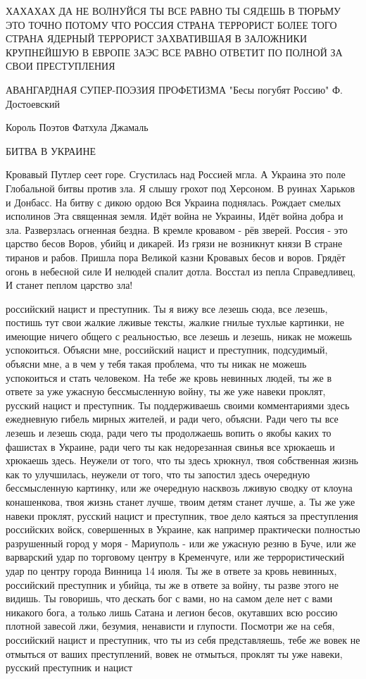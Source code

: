 ХАХАХАХ ДА НЕ ВОЛНУЙСЯ ТЫ ВСЕ РАВНО ТЫ СЯДЕШЬ В ТЮРЬМУ ЭТО ТОЧНО ПОТОМУ ЧТО
РОССИЯ СТРАНА ТЕРРОРИСТ БОЛЕЕ ТОГО СТРАНА ЯДЕРНЫЙ ТЕРРОРИСТ ЗАХВАТИВШАЯ В
ЗАЛОЖНИКИ КРУПНЕЙШУЮ В ЕВРОПЕ ЗАЭС ВСЕ РАВНО ОТВЕТИТ ПО ПОЛНОЙ ЗА СВОИ
ПРЕСТУПЛЕНИЯ

АВАНГАРДНАЯ СУПЕР-ПОЭЗИЯ ПРОФЕТИЗМА 
"Бесы погубят Россию" 
Ф. Достоевский

Король Поэтов Фатхула Джамаль

БИТВА В УКРАИНЕ 

Кровавый Путлер сеет горе. 
Сгустилась над Россией мгла.
А Украина это поле
Глобальной битвы против зла. 
Я слышу грохот под Херсоном.
В руинах Харьков и Донбасс.
На битву с дикою ордою
Вся Украина поднялась. 
Рождает смелых исполинов 
Эта священная земля.
Идёт война не Украины, 
Идёт война добра и зла.
Разверзлась огненная бездна. 
В кремле кровавом - рёв зверей.
Россия - это царство бесов 
Воров, убийц и дикарей. 
Из грязи не возникнут князи 
В стране тиранов и рабов. 
Пришла пора Великой казни 
Кровавых бесов и воров.
Грядёт огонь в небесной силе
И нелюдей спалит дотла.
Восстал из пепла Справедливец, 
И станет пеплом царство зла! 


российский нацист и преступник. Ты я вижу все лезешь сюда, все лезешь, постишь
тут свои жалкие лживые тексты, жалкие гнилые тухлые картинки, не имеющие ничего
общего с реальностью, все лезешь и лезешь, никак не можешь успокоиться. Объясни
мне, российский нацист и преступник, подсудимый, объясни мне, а в чем у тебя
такая проблема, что ты никак не можешь успокоиться и стать человеком. На тебе
же кровь невинных людей, ты же в ответе за уже ужасную бессмысленную войну, ты
же уже навеки проклят, русский нацист и преступник.  Ты поддерживаешь своими
комментариями здесь ежедневную гибель мирных жителей, и ради чего, объясни.
Ради чего ты все лезешь и лезешь сюда, ради чего ты продолжаешь вопить о якобы
каких то фашистах в Украине, ради чего ты как недорезанная свинья все хрюкаешь
и хрюкаешь здесь. Неужели от того, что ты здесь хрюкнул, твоя собственная жизнь
как то улучшилась, неужели от того, что ты запостил здесь очередную
бессмысленную картинку, или же очередную насквозь лживую сводку от клоуна
конашенкова, твоя жизнь станет лучше, твоим детям станет лучше, а. Ты же уже
навеки проклят, русский нацист и преступник, твое дело каяться за преступления
российских войск, совершенных в Украине, как например практически полностью
разрушенный город у моря - Мариуполь - или же ужасную резню в Буче, или же
варварский удар по торговому центру в Кременчуге, или же террористический удар
по центру города Винница 14 июля. Ты же в
ответе за кровь невинных, российский преступник и убийца, ты же в ответе за
войну, ты разве этого не видишь.  Ты говоришь, что дескать бог с вами, но на
самом деле нет с вами никакого бога, а только лишь Сатана и легион бесов,
окутавших всю россию плотной завесой лжи, безумия, ненависти и глупости.
Посмотри же на себя, российский нацист и преступник, что ты из себя
представляешь, тебе же вовек не отмыться от ваших преступлений, вовек не
отмыться, проклят ты уже навеки, русский преступник и нацист

